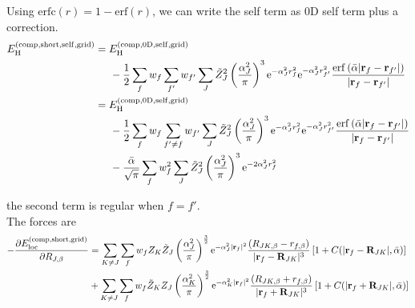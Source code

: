 \documentclass[paper=a4, fontsize=11pt]{article} %
\numberwithin{equation}{section} %
\numberwithin{figure}{section} %
\numberwithin{table}{section} %
\newcommand{\p}{\partial}
\newcommand{\br}{{\bf{r}}}
\newcommand{\bR}{{\bf{R}}}
\newcommand{\rself}{{\mathrm{self}}}
\newcommand{\re}{{\mathrm{e}}}
\newcommand{\rshort}{{\mathrm{short}}}
\newcommand{\rerf}{{\mathrm{erf}}}
\newcommand{\rerfc}{{\mathrm{erfc}}}
\newcommand{\rH}{{\mathrm{H}}}
\newcommand{\rcomp}{{\mathrm{comp}}}
\newcommand{\rgrid}{{\mathrm{grid}}}
\newcommand{\rlo}{{\mathrm{loc}}}
\newcommand{\al}{{\alpha}}
\newcommand{\RJb}{{R_{J,\beta}}}
\newcommand{\bal}{{\bar{\alpha}}}
\begin{document}
Using $\rerfc(r) = 1 - \rerf(r)$, we can write the self term as 0D self term plus a correction.
\begin{equation}
\begin{split}
E_{\rH}^{(\rcomp,\rshort,\rself,\rgrid)} 
&= E_{\rH}^{(\rcomp,\mathrm{0D},\rself,\rgrid)} \\
&\hspace{5mm} - \frac{1}{2}\sum_f w_f \sum_{f'} w_{f'} \sum_J \tilde Z_J^2 \left(\frac{\al_J^2}{\pi}\right)^{3} \re^{-\al_J^2 r_f^2}\re^{-\al_J^2 r_{f'}^2} \frac{\rerf\left(\bal|\br_f-\br_{f'}|\right)}{|\br_f-\br_{f'}|} \\
&= E_{\rH}^{(\rcomp,\mathrm{0D},\rself,\rgrid)} \\
&\hspace{5mm} - \frac{1}{2}\sum_f w_f \sum_{f' \neq f} w_{f'} \sum_J \tilde Z_J^2 \left(\frac{\al_J^2}{\pi}\right)^{3} \re^{-\al_J^2 r_f^2}\re^{-\al_J^2 r_{f'}^2} \frac{\rerf\left(\bal|\br_f-\br_{f'}|\right)}{|\br_f-\br_{f'}|} \\
&\hspace{5mm} - \frac{\bal}{\sqrt{\pi}}\sum_f w_f^2 \sum_J \tilde Z_J^2 \left(\frac{\al_J^2}{\pi}\right)^{3} \re^{-2\al_J^2 r_f^2} 
\end{split}
\end{equation}

the second term is regular when $f=f'$.\\

The forces are
\begin{equation}
\begin{split}
-\frac{\p E_{\rlo}^{(\rcomp,\rshort,\rgrid)}}{\p \RJb} &= \sum_{K \neq J} \sum_f w_f Z_K\tilde Z_{J}\left(\frac{\al_{J}^2}{\pi}\right)^{\frac{3}{2}} \re^{-\al_{J}^2|\br_f|^2}\frac{\left(R_{JK,\beta}-r_{f,\beta}\right)}{|\br_f - \bR_{JK}|^3}\left[1 + C( |\br_f - \bR_{JK}|,\bal)\right]\\
& +\sum_{K \neq J} \sum_f w_f \tilde Z_K Z_{J}\left(\frac{\al_{K}^2}{\pi}\right)^{\frac{3}{2}} \re^{-\al_{K}^2|\br_f|^2}\frac{\left(R_{JK,\beta}+r_{f,\beta}\right)}{|\br_f + \bR_{JK}|^3} \left[1 + C( |\br_f + \bR_{JK}|,\bal)\right]\\ 
\end{split}
\end{equation}
\end{document}
